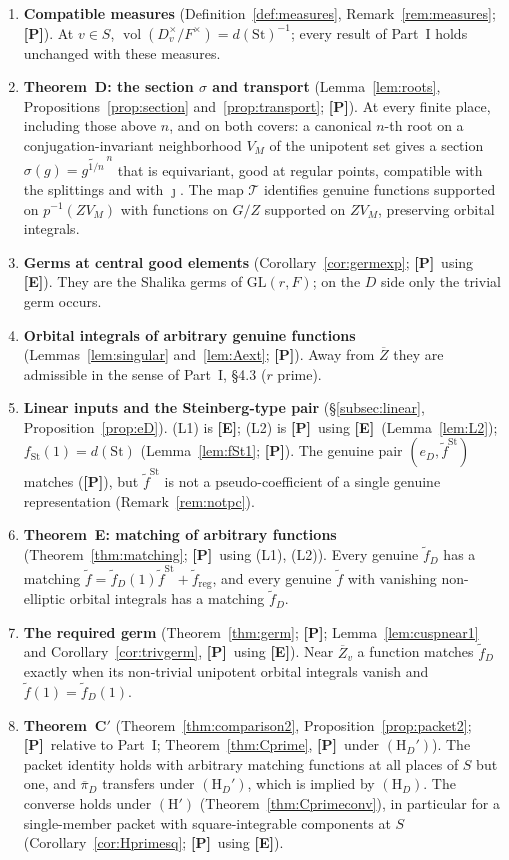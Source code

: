 \documentclass[12pt]{article}
\newcommand{\ov}[1]{\overline{#1}}
\newcommand{\reg}{\mathrm{reg}}
\newcommand{\vol}{\operatorname{vol}}
\newcommand{\GL}{\mathrm{GL}}
\newcommand{\St}{\mathrm{St}}
\newcommand{\Zb}{\ov{Z}}
\newcommand{\pib}{\ov{\pi}}
\newcommand{\jj}{\jmath}
\newcommand{\sg}{\sigma}
\newcommand{\Pv}{\textbf{[P]}}
\newcommand{\Ev}{\textbf{[E]}}
\theoremstyle{plain}
\theoremstyle{definition}
\begin{document}
\begin{enumerate}[leftmargin=*,label=\arabic*.]
\item \textbf{Compatible measures} (Definition~\ref{def:measures}, Remark~\ref{rem:measures}; \Pv). At $v\in S$, $\vol(D_v^\times/F^\times)=d(\St)^{-1}$; every result of Part~I holds unchanged with these measures.
\item \textbf{Theorem~D: the section $\sg$ and transport} (Lemma~\ref{lem:roots}, Propositions~\ref{prop:section} and~\ref{prop:transport}; \Pv). At every finite place, including those above $n$, and on both covers: a canonical $n$-th root on a conjugation-invariant neighborhood $V_M$ of the unipotent set gives a section $\sg(g)=\widetilde{g^{1/n}}^{\,n}$ that is equivariant, good at regular points, compatible with the splittings and with $\jj$. The map $\mathcal T$ identifies genuine functions supported on $p^{-1}(ZV_M)$ with functions on $G/Z$ supported on $ZV_M$, preserving orbital integrals.
\item \textbf{Germs at central good elements} (Corollary~\ref{cor:germexp}; \Pv\ using \Ev). They are the Shalika germs of $\GL(r,F)$; on the $D$ side only the trivial germ occurs.
\item \textbf{Orbital integrals of arbitrary genuine functions} (Lemmas~\ref{lem:singular} and~\ref{lem:Aext}; \Pv). Away from $\Zb$ they are admissible in the sense of Part~I, \S4.3 ($r$ prime).
\item \textbf{Linear inputs and the Steinberg-type pair} (\S\ref{subsec:linear}, Proposition~\ref{prop:eD}). (L1) is \Ev; (L2) is \Pv\ using \Ev\ (Lemma~\ref{lem:L2}); $f_{\St}(1)=d(\St)$ (Lemma~\ref{lem:fSt1}; \Pv). The genuine pair $(e_D,\tilde f^{\St})$ matches (\Pv), but $\tilde f^{\St}$ is not a pseudo-coefficient of a single genuine representation (Remark~\ref{rem:notpc}).
\item \textbf{Theorem~E: matching of arbitrary functions} (Theorem~\ref{thm:matching}; \Pv\ using (L1), (L2)). Every genuine $\tilde f_D$ has a matching $\tilde f=\tilde f_D(1)\tilde f^{\St}+\tilde f_{\reg}$, and every genuine $\tilde f$ with vanishing non-elliptic orbital integrals has a matching $\tilde f_D$.
\item \textbf{The required germ} (Theorem~\ref{thm:germ}; \Pv; Lemma~\ref{lem:cuspnear1} and Corollary~\ref{cor:trivgerm}, \Pv\ using \Ev). Near $\Zb_v$ a function matches $\tilde f_D$ exactly when its non-trivial unipotent orbital integrals vanish and $\tilde f(1)=\tilde f_D(1)$.
\item \textbf{Theorem~C$'$} (Theorem~\ref{thm:comparison2}, Proposition~\ref{prop:packet2}; \Pv\ relative to Part~I; Theorem~\ref{thm:Cprime}, \Pv\ under $(\mathrm H_D')$). The packet identity holds with arbitrary matching functions at all places of $S$ but one, and $\pib_D$ transfers under $(\mathrm H_D')$, which is implied by $(\mathrm H_D)$. The converse holds under $(\mathrm H')$ (Theorem~\ref{thm:Cprimeconv}), in particular for a single-member packet with square-integrable components at $S$ (Corollary~\ref{cor:Hprimesq}; \Pv\ using \Ev).

\end{enumerate}
\end{document}
